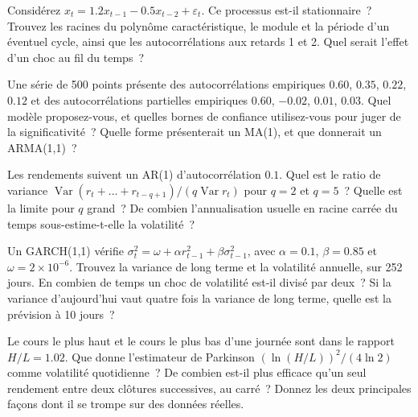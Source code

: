 \begin{question}\label{iq:iv1:time-series:5}
Considérez $x_t = 1.2x_{t-1} - 0.5x_{t-2} + \varepsilon_t$. Ce processus est-il stationnaire~? Trouvez les racines du polynôme caractéristique, le module et la période d'un éventuel cycle, ainsi que les autocorrélations aux retards 1 et 2. Quel serait l'effet d'un choc au fil du temps~?
\end{question}

\begin{question}\label{iq:iv1:time-series:6}
Une série de 500 points présente des autocorrélations empiriques $0.60$, $0.35$, $0.22$, $0.12$ et des autocorrélations partielles empiriques $0.60$, $-0.02$, $0.01$, $0.03$. Quel modèle proposez-vous, et quelles bornes de confiance utilisez-vous pour juger de la significativité~? Quelle forme présenterait un MA(1), et que donnerait un ARMA(1,1)~?
\end{question}

\begin{question}\label{iq:iv1:time-series:7}
Les rendements suivent un AR(1) d'autocorrélation $0.1$. Quel est le ratio de variance $\operatorname{Var}(r_t + \dots + r_{t-q+1})/(q\operatorname{Var}r_t)$ pour $q = 2$ et $q = 5$~? Quelle est la limite pour $q$ grand~? De combien l'annualisation usuelle en racine carrée du temps sous-estime-t-elle la volatilité~?
\end{question}

\begin{question}\label{iq:iv1:time-series:8}
Un GARCH(1,1) vérifie $\sigma_t^2 = \omega + \alpha r_{t-1}^2 + \beta\sigma_{t-1}^2$, avec $\alpha = 0.1$, $\beta = 0.85$ et $\omega = 2 \times 10^{-6}$. Trouvez la variance de long terme et la volatilité annuelle, sur 252 jours. En combien de temps un choc de volatilité est-il divisé par deux~? Si la variance d'aujourd'hui vaut quatre fois la variance de long terme, quelle est la prévision à 10 jours~?
\end{question}

\begin{question}\label{iq:iv1:time-series:9}
Le cours le plus haut et le cours le plus bas d'une journée sont dans le rapport $H/L = 1.02$. Que donne l'estimateur de Parkinson $(\ln(H/L))^2/(4\ln 2)$ comme volatilité quotidienne~? De combien est-il plus efficace qu'un seul rendement entre deux clôtures successives, au carré~? Donnez les deux principales façons dont il se trompe sur des données réelles.
\end{question}

